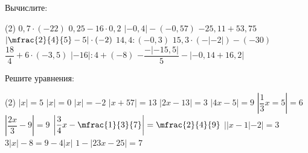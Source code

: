 %			

\begin{class}[number=2]
	\begin{listofex}
		\item Вычислите:
		\begin{tasks}(2)
			\task \( 0,7 \cdot (-22) \)
			\task \( 0,25 - 16 \cdot 0,2 \)
			\task \( |-0,4| - (-0,57) \)
			\task \( -25,11 + 53,75 \)
			\task \( \left| \mfrac{2}{4}{5} - 5 \right| \cdot (-2) \)
			\task \( 14,4 : (-0,3) \)
			\task \( 15,3 \cdot (-|-2|) - (-30) \)
			\task \( \dfrac{18}{4} + 6 \cdot (-3,5) \)
			\task \( |-16| : 4 + (-8) \)
			\task \( -\dfrac{-|-15,5|}{5} - |-0,14+16,2| \)
		\end{tasks}
		\item Решите уравнения:
		\begin{tasks}(2)
			\task \( |x|=5 \)
			\task \( |x|=0 \)
			\task \( |x|=-2 \)
			\task \( |x+57|=13 \)
			\task \( |2x-13|=3 \)
			\task \( |4x-5|=9 \)
			\task \( \left| \dfrac{1}{3}x=5 \right|=6 \)
			\task \( \left| \dfrac{2x}{3}-9 \right|=9 \)
			\task \( \left| \dfrac{3}{4}x-\mfrac{1}{3}{7} \right|=\mfrac{2}{4}{9} \)
			\task \( ||x-1|-2|=3 \)
			\task \( 3|x|-8=9-4|x| \)
			\task \( 1-|23x-25|=7 \)
		\end{tasks}
	\end{listofex}
\end{class}

